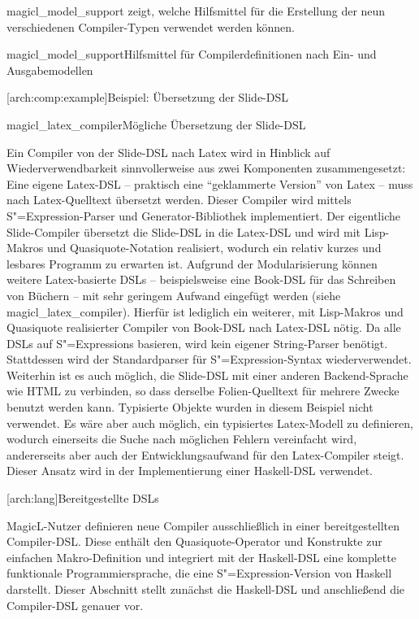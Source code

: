 \documentclass[12pt, a4paper, bibgerm]{scrbook}
\newcommand\lsection{}
\newcommand\lsubsubsection{}
\newcommand\abb{}
\newcommand\fig{}
\newcommand{\seea}[1]{(siehe \abb{#1})}
\newcommand{\sexp}{S"=Expression}
\newcommand{\sexps}{S"=Expressions}
\begin{document}
\medskip{}

\abb{magicl_model_support} zeigt, welche Hilfsmittel für die Erstellung
der neun verschiedenen Compiler-Typen verwendet werden können.

\fig{magicl_model_support}{Hilfsmittel für Compilerdefinitionen nach
  Ein- und Ausgabemodellen}

\lsubsubsection[arch:comp:example]{Beispiel: Übersetzung der Slide-DSL}

\fig{magicl_latex_compiler}{Mögliche Übersetzung der Slide-DSL}

Ein Compiler von der Slide-DSL nach Latex wird in Hinblick auf
Wiederverwendbarkeit sinnvollerweise aus zwei Komponenten
zusammengesetzt: Eine eigene Latex-DSL -- praktisch eine "`geklammerte
Version"' von Latex -- muss nach Latex-Quelltext übersetzt werden.
Dieser Compiler wird mittels \sexp{}-Parser und Generator-Bibliothek
implementiert. Der eigentliche Slide-Compiler übersetzt die Slide-DSL in
die Latex-DSL und wird mit Lisp-Makros und Quasiquote-Notation
realisiert, wodurch ein relativ kurzes und lesbares Programm zu erwarten
ist. Aufgrund der Modularisierung können weitere Latex-basierte DSLs --
beispielsweise eine Book-DSL für das Schreiben von Büchern -- mit sehr
geringem Aufwand eingefügt werden \seea{magicl_latex_compiler}. Hierfür
ist lediglich ein weiterer, mit Lisp-Makros und Quasiquote realisierter
Compiler von Book-DSL nach Latex-DSL nötig. Da alle DSLs auf \sexps{}
basieren, wird kein eigener String-Parser benötigt. Stattdessen wird
der Standardparser für \sexp{}-Syntax wiederverwendet. Weiterhin ist es
auch möglich, die Slide-DSL mit einer anderen Backend-Sprache wie HTML
zu verbinden, so dass derselbe Folien-Quelltext für mehrere
Zwecke benutzt werden kann. Typisierte Objekte wurden in diesem Beispiel
nicht verwendet. Es wäre aber auch möglich, ein typisiertes
Latex-Modell zu definieren, wodurch einerseits die Suche nach möglichen Fehlern
vereinfacht wird, andererseits aber auch der Entwicklungsaufwand für den
Latex-Compiler steigt. Dieser Ansatz wird in der Implementierung
einer Haskell-DSL verwendet.

\lsection[arch:lang]{Bereitgestellte DSLs}

MagicL-Nutzer definieren neue Compiler ausschließlich in einer
bereitgestellten Compiler-DSL. Diese enthält den Quasiquote-Operator und
Konstrukte zur einfachen Makro-Definition und integriert mit der
Haskell-DSL eine komplette funktionale Programmiersprache, die eine
\sexp{}-Version von Haskell darstellt. Dieser Abschnitt stellt zunächst
die Haskell-DSL und anschließend die Compiler-DSL genauer vor.
\end{document}
